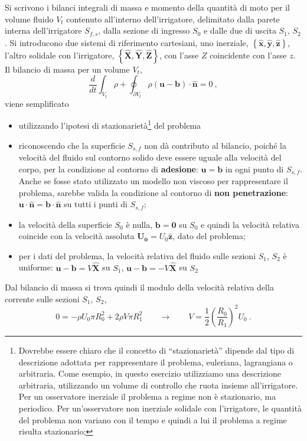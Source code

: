 \parttwo
Si scrivono i bilanci integrali di massa e momento della quantità di moto per il volume fluido $V_t$ contenuto all'interno dell'irrigatore, delimitato dalla parete interna dell'irrigatore $S_{f,s}$, dalla sezione di ingresso $S_0$ e dalle due di uscita $S_1$, $S_2$. Si introducono due sistemi di riferimento cartesiani, uno inerziale, $\left\{ \bm{\hat{x}}, \bm{\hat{y}}, \bm{\hat{z}} \right\}$, l'altro solidale con l'irrigatore, $\left\{ \bm{\hat{X}}, \bm{\hat{Y}}, \bm{\hat{Z}} \right\}$, con l'asse $Z$ coincidente con l'asse $z$.
%
\newline
\noindent
Il bilancio di massa per un volume $V_t$,
\begin{equation}
 \dfrac{d}{dt} \int_{V_t} \rho + \oint_{\partial V_t} \rho \left(\bm{u} - \bm{b} \right) \cdot \bm{\hat{n}} = 0 \ ,
\end{equation}
viene semplificato
\begin{itemize}
\item utilizzando l'ipotesi di stazionarietà\footnote{
 Dovrebbe essere chiaro che il concetto di ``stazionarietà'' dipende dal tipo di descrizione adottata per rappresentare il problema, euleriana, lagrangiana o arbitraria. Come esempio, in questo esercizio utilizziamo una descrizione arbitraria, utilizzando un volume di controllo che ruota insieme all'irrigatore. Per un osservatore inerziale il problema a regime non è stazionario, ma periodico. Per un'osservatore non inerziale solidale con l'irrigatore, le quantità del problema non variano con il tempo e quindi a lui il problema a regime risulta stazionario;
}
del problema
\item riconoscendo che la superficie $S_{s,f}$ non dà contributo al bilancio, poiché la velocità del fluido sul contorno solido deve essere uguale alla velocità del corpo, per la condizione al contorno di \textbf{adesione}: $\bm{u} = \bm{b}$ in ogni punto di $S_{s,f}$. Anche se fosse stato utilizzato un modello non viscoso per rappresentare il problema, sarebbe valida la condizione al contorno di \textbf{non penetrazione}: $\bm{u} \cdot \bm{\hat{n}} = \bm{b} \cdot \bm{\hat{n}}$ su tutti i punti di $S_{s,f}$; 
\item la velocità della superficie $S_0$ è nulla, $\bm{b} = \bm{0}$ su $S_0$ e quindi la velocità relativa coincide con la velocità assoluta $\bm{U_0} = U_0 \bm{\hat{z}}$, dato del problema;
\item per i dati del problema, la velocità relativa del fluido sulle sezioni $S_1$, $S_2$ è uniforme:
$\bm{u}-\bm{b} = V \bm{\hat{X}}$ su $S_1$, $\bm{u}-\bm{b} = -V \bm{\hat{X}}$ su $S_2$
\end{itemize}
Dal bilancio di massa si trova quindi il modulo della velocità relativa della corrente sulle sezioni $S_1$, $S_2$,
\begin{equation}
 0 = - \rho U_0 \pi R_0^2 + 2 \rho V \pi R_1^2 \qquad \rightarrow \qquad
  V = \dfrac{1}{2} \left(\dfrac{R_0}{R_1}\right)^2 U_0 \ .
\end{equation}

